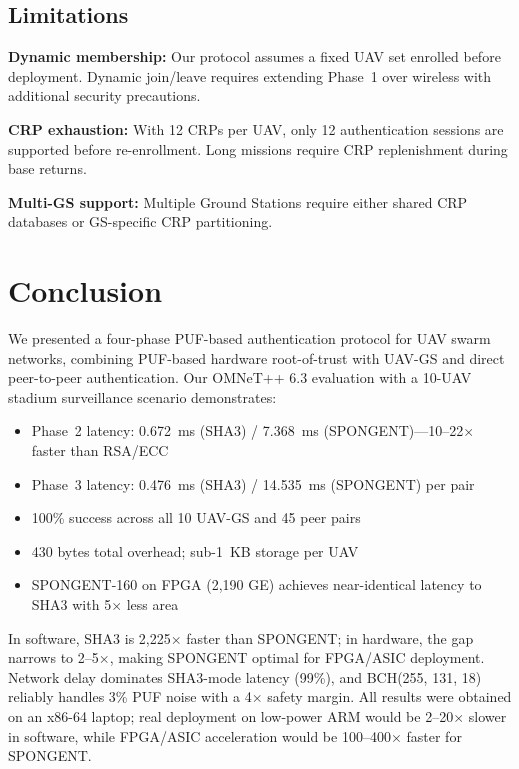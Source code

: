 \documentclass[11pt,a4paper]{article}
\begin{document}
\subsection{Limitations}

\textbf{Dynamic membership:} Our protocol assumes a fixed UAV set enrolled before deployment. Dynamic join/leave requires extending Phase~1 over wireless with additional security precautions.

\textbf{CRP exhaustion:} With 12 CRPs per UAV, only 12 authentication sessions are supported before re-enrollment. Long missions require CRP replenishment during base returns.

\textbf{Multi-GS support:} Multiple Ground Stations require either shared CRP databases or GS-specific CRP partitioning.


\section{Conclusion}
\label{sec:conclusion}

We presented a four-phase PUF-based authentication protocol for UAV swarm networks, combining PUF-based hardware root-of-trust with UAV-GS and direct peer-to-peer authentication. Our OMNeT++ 6.3 evaluation with a 10-UAV stadium surveillance scenario demonstrates:

\begin{itemize}[leftmargin=*]
    \item Phase~2 latency: 0.672~ms (SHA3) / 7.368~ms (SPONGENT)---10--22$\times$ faster than RSA/ECC
    \item Phase~3 latency: 0.476~ms (SHA3) / 14.535~ms (SPONGENT) per pair
    \item 100\% success across all 10 UAV-GS and 45 peer pairs
    \item 430 bytes total overhead; sub-1~KB storage per UAV
    \item SPONGENT-160 on FPGA (2,190 GE) achieves near-identical latency to SHA3 with 5$\times$ less area
\end{itemize}

In software, SHA3 is 2,225$\times$ faster than SPONGENT; in hardware, the gap narrows to 2--5$\times$, making SPONGENT optimal for FPGA/ASIC deployment. Network delay dominates SHA3-mode latency (99\%), and BCH(255, 131, 18) reliably handles 3\% PUF noise with a 4$\times$ safety margin. All results were obtained on an x86-64 laptop; real deployment on low-power ARM would be 2--20$\times$ slower in software, while FPGA/ASIC acceleration would be 100--400$\times$ faster for SPONGENT.
\end{document}
